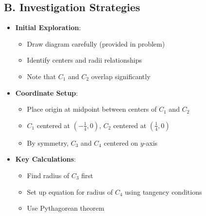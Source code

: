 \documentclass[11pt]{article}
\begin{document}
\begin{strategybox}
\subsection*{B. Investigation Strategies}
\begin{itemize}[leftmargin=*]
    \item \textbf{Initial Exploration}:
    \begin{itemize}
        \item Draw diagram carefully (provided in problem)
        \item Identify centers and radii relationships
        \item Note that $C_1$ and $C_2$ overlap significantly
    \end{itemize}
    \item \textbf{Coordinate Setup}:
    \begin{itemize}
        \item Place origin at midpoint between centers of $C_1$ and $C_2$
        \item $C_1$ centered at $(-\frac{1}{4}, 0)$, $C_2$ centered at $(\frac{1}{4}, 0)$
        \item By symmetry, $C_3$ and $C_4$ centered on $y$-axis
    \end{itemize}
    \item \textbf{Key Calculations}:
    \begin{itemize}
        \item Find radius of $C_3$ first
        \item Set up equation for radius of $C_4$ using tangency conditions
        \item Use Pythagorean theorem
    \end{itemize}
\end{itemize}


\end{strategybox}
\end{document}
